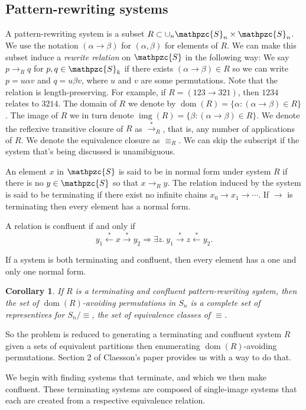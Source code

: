 \documentclass[a4paper, 11pt]{article}
\newtheorem{corollary}[theorem]{Corollary}
\theoremstyle{definition}
\newcommand{\Sym}{\mathpzc{S}}
\newcommand{\from}{\leftarrow}
\newcommand{\tostar}{\stackrel{*}{\to}}
\newcommand{\fromstar}{\stackrel{*}{\from}}
\DeclareMathOperator{\dom}{dom}
\DeclareMathOperator{\img}{img}
\begin{document}
\subsection{Pattern-rewriting systems}
A pattern-rewriting system is a subset $R \subset \cup_n \Sym_n \times \Sym_n$.
We use the notation $(\alpha \to \beta)$ for $(\alpha, \beta)$ for elements of
$R$.
We can make this subset induce a \emph{rewrite relation} on $\Sym$ in the following way: We say
$p \to_R q$ for $p, q \in \Sym_k$ if there exists $(\alpha \to \beta) \in R$ so
we can write $p = u \alpha v$ and $q = u \beta v$, where
$u$ and $v$ are some permutations.  Note that the relation is
length-preserving.  For example, if $R = {(123 \to 321)}$, then $1234$ relates to
$3214$. The domain of $R$ we denote by $\dom(R) = \{\alpha : (\alpha \to \beta) \in
R\}$. The image of $R$ we in turn denote $\img(R) = \{\beta : (\alpha \to \beta) \in
R\}$. We denote the reflexive transitive closure of $R$ as $\tostar_R$, that is,
any number of applications of $R$. We denote the equivalence closure as
$\equiv_R$. We can skip the subscript if the system that's being discussed is
unamibiguous. 

An element $x$ in $\Sym$ is said to be in normal form under system $R$ if there
is no $y \in \Sym$ so that $x \to_R y$. The relation induced by the system is
said to be terminating if there exist no infinite chains $x_0 \to x_1 \to
\cdots$. If $\to$ is terminating then every element has a normal form. 

A relation is confluent if and only if
$$
    y_1 \fromstar x \tostar y_2 \Longrightarrow 
    \exists z. \  y_1 \tostar z \fromstar y_2.
$$

If a system is both terminating and confluent, then every element has a one and
only one normal form.

\begin{corollary}
    If $R$ is a terminating and confluent pattern-rewriting system, then the set
    of $\dom(R)$-avoiding permutations in $S_n$ is a complete set of
    representives for $S_n / \equiv$, the set of equivalence classes of
    $\equiv$.
\end{corollary}

So the problem is reduced to generating a terminating and confluent system $R$
given a sets of equivalent partitions then enumerating $\dom(R)$-avoiding permutations.
Section 2 of Claesson's paper provides us with a way to do that. \cite{claesson}

We begin with finding systems that terminate, and which we then make confluent.
These terminating systems are composed of single-image systems that each are
created from a respective equivalence relation.
\end{document}
